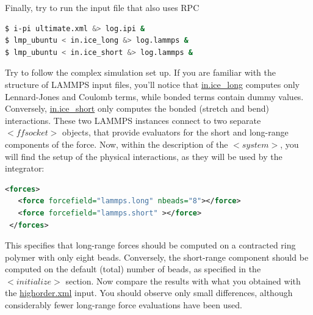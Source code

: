 \documentclass{article}
\begin{document}
\begin{Exercise}[label={sc-all},title={Doing PIMD Like a Pro}]
\Question Finally, try to run the input file that also uses RPC
\begin{lstlisting}[language=bash]
$ i-pi ultimate.xml &> log.ipi &
$ lmp_ubuntu < in.ice_long &> log.lammps &
$ lmp_ubuntu < in.ice_short &> log.lammps &
\end{lstlisting}%
Try to follow the complex simulation set up. If you are familiar with the structure
of LAMMPS input files, you'll notice that \url{in.ice_long} computes only
Lennard-Jones and Coulomb terms, while bonded terms contain dummy values.
Conversely, \url{in.ice_short} only computes the bonded (stretch and bend)
interactions. These two LAMMPS instances connect to two separate \lstinxml$<ffsocket>$
objects, that provide evaluators for the short and long-range components of
the force. Now, within the description of the \lstinxml$<system>$, you will
find the setup of the physical interactions, as they will be used by the 
integrator:
\begin{lstlisting}[language=xml]
 <forces>
   <force forcefield="lammps.long" nbeads="8"></force>
   <force forcefield="lammps.short" ></force>
 </forces>
\end{lstlisting}
This specifies that long-range forces should be 
computed on a contracted ring polymer with only eight beads. Conversely, 
the short-range component should be computed
on the default (total) number of beads, as specified in the \lstinxml$<initialize>$
section. 
Now compare the results with what you obtained with the \url{highorder.xml} 
input. You should observe only small differences, although considerably fewer
long-range force evaluations have been used. 

\end{Exercise}



\end{document}
